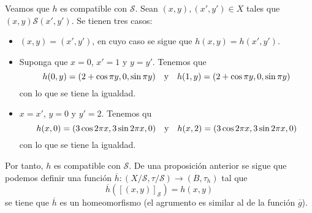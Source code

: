\documentclass[12pt]{report}
\theoremstyle{largebreak}
\newcommand\cf[3]{\ensuremath{#1:#2\rightarrow#3}}
\begin{document}
\begin{exa}
        Veamos que $h$ es compatible con $\mathcal{S}$. Sean $(x,y),(x',y')\in X$ tales que $(x,y)\mathcal{S}(x',y')$. Se tienen tres casos:
        \begin{itemize}
            \item $(x,y)=(x',y')$, en cuyo caso se sigue que $h(x,y)=h(x',y')$.
            \item Suponga que $x=0$, $x'=1$ y $y=y'$. Tenemos que
            \begin{equation*}
                h(0,y)=(2+\cos\pi y,0,\sin\pi y)\quad\textup{y}\quad h(1,y)=(2+\cos\pi y,0,\sin\pi y)
            \end{equation*}
            con lo que se tiene la igualdad.
            \item $x=x'$, $y=0$ y $y'=2$. Tenemos qu 
            \begin{equation*}
                h(x,0)=(3\cos2\pi x,3\sin 2\pi x,0)\quad\textup{y}\quad h(x,2)=(3\cos2\pi x,3\sin 2\pi x,0)
            \end{equation*}
            con lo que se tiene la igualdad.
        \end{itemize}
        Por tanto, $h$ es compatible con $\mathcal{S}$. De una proposición anterior se sigue que podemos definir una función $\cf{\overline{h}}{(X/\mathcal{S},\tau/\mathcal{S})}{(B,\tau_h)}$ tal que
        \begin{equation*}
            \overline{h}([(x,y)]_{\mathcal{S}})=h(x,y)
        \end{equation*}
        se tiene que $\overline{h}$ es un homeomorfismo (el agrumento es similar al de la función $\overline{g}$).


\end{exa}
\end{document}
